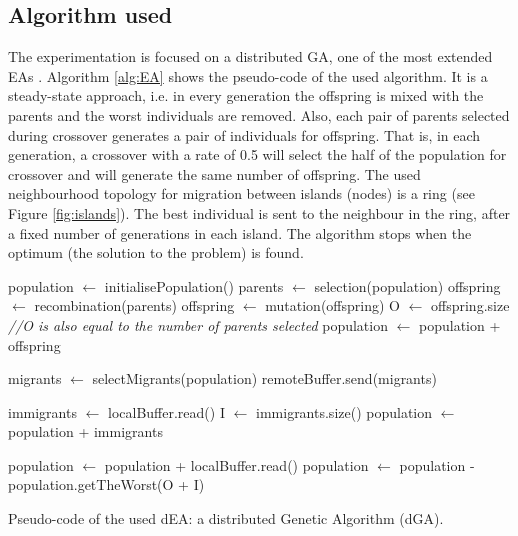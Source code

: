 \documentclass[final,1p,times]{elsarticle}
\begin{document}



\subsection{Algorithm used}
The experimentation is focused on a distributed GA, one of the most extended EAs \cite{GeneticAlgorithmsEiben03}. Algorithm \ref{alg:EA} shows the pseudo-code of the  used algorithm.
It is a steady-state approach, i.e. in every generation the offspring is mixed with the parents and the worst individuals are removed. Also, each pair of parents selected during crossover generates a pair of individuals for offspring. That is, in each generation, a crossover with a rate of 0.5 will select the half of the population for crossover and will generate the same number of offspring. The used neighbourhood topology for migration between islands (nodes) is a ring (see Figure \ref{fig:islands}). The best individual is sent to the neighbour in the ring, after a fixed number of generations in each island. The algorithm stops when the optimum (the solution to the problem) is found.  



\begin{algorithm}[htb]

\begin{algorithmic}
\STATE population $\gets$ initialisePopulation()
    \STATE parents $\gets$ selection(population)
    \STATE offspring $\gets$ recombination(parents)
    \STATE offspring $\gets$ mutation(offspring)
    \STATE O $\gets$ offspring.size {\em //O is also equal to the number of parents selected}
    \STATE population $\gets$ population + offspring
    
      \STATE migrants $\gets$ selectMigrants(population)
      \STATE remoteBuffer.send(migrants)
    \ENDIF

      \STATE immigrants $\gets$ localBuffer.read()
      \STATE I $\gets$ immigrants.size()
      \STATE population $\gets$ population + immigrants
    \ENDIF
    
      \STATE population $\gets$ population + localBuffer.read()
    \ENDIF
    \STATE population $\gets$ population - population.getTheWorst(O + I)
\ENDWHILE

\end{algorithmic}

\caption{Pseudo-code of the used dEA: a distributed Genetic Algorithm (dGA).}
\label{alg:EA}
\end{algorithm}
\end{document}
